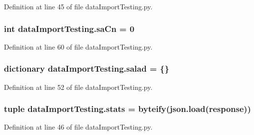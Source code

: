 Definition at line 45 of file data\-Import\-Testing.\-py.

\hypertarget{namespacedataImportTesting_adf726ee7682fceb53d621a9eb9c13ff7}{
\subsubsection[{sa\-Cn}]{\setlength{\rightskip}{0pt plus 5cm}int data\-Import\-Testing.\-sa\-Cn = 0}}\label{namespacedataImportTesting_adf726ee7682fceb53d621a9eb9c13ff7}


Definition at line 60 of file data\-Import\-Testing.\-py.

\hypertarget{namespacedataImportTesting_af499d40f6bdb91b736fb75a44d7675e0}{
\subsubsection[{salad}]{\setlength{\rightskip}{0pt plus 5cm}dictionary data\-Import\-Testing.\-salad = \{\}}}\label{namespacedataImportTesting_af499d40f6bdb91b736fb75a44d7675e0}


Definition at line 52 of file data\-Import\-Testing.\-py.

\hypertarget{namespacedataImportTesting_ae0b8c6e52898295995c6bb0bf028938c}{
\subsubsection[{stats}]{\setlength{\rightskip}{0pt plus 5cm}tuple data\-Import\-Testing.\-stats = {\bf byteify}(json.\-load({\bf response}))}}\label{namespacedataImportTesting_ae0b8c6e52898295995c6bb0bf028938c}


Definition at line 46 of file data\-Import\-Testing.\-py.

